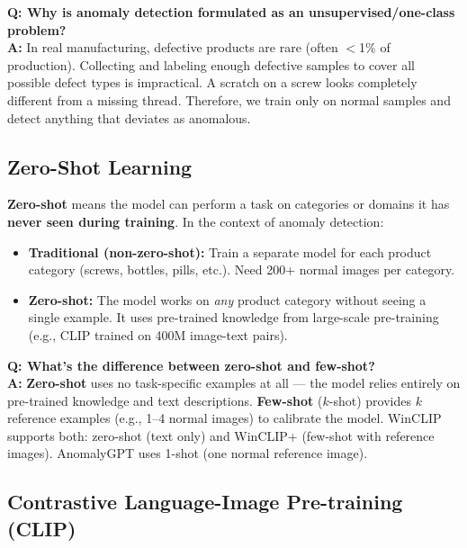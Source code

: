 \documentclass[12pt, a4paper]{article}
\begin{document}
\begin{vivaqa}
\textbf{Q: Why is anomaly detection formulated as an unsupervised/one-class problem?}\\[4pt]
\textbf{A:} In real manufacturing, defective products are rare (often $<$1\% of production). Collecting and labeling enough defective samples to cover all possible defect types is impractical. A scratch on a screw looks completely different from a missing thread. Therefore, we train only on normal samples and detect anything that deviates as anomalous.
\end{vivaqa}

\subsection{Zero-Shot Learning}

\textbf{Zero-shot} means the model can perform a task on categories or domains it has \textbf{never seen during training}. In the context of anomaly detection:

\begin{itemize}[leftmargin=*]
    \item \textbf{Traditional (non-zero-shot):} Train a separate model for each product category (screws, bottles, pills, etc.). Need 200+ normal images per category.
    \item \textbf{Zero-shot:} The model works on \textit{any} product category without seeing a single example. It uses pre-trained knowledge from large-scale pre-training (e.g., CLIP trained on 400M image-text pairs).
\end{itemize}

\begin{vivaqa}
\textbf{Q: What's the difference between zero-shot and few-shot?}\\[4pt]
\textbf{A:} \textbf{Zero-shot} uses no task-specific examples at all --- the model relies entirely on pre-trained knowledge and text descriptions. \textbf{Few-shot} ($k$-shot) provides $k$ reference examples (e.g., 1--4 normal images) to calibrate the model. WinCLIP supports both: zero-shot (text only) and WinCLIP+ (few-shot with reference images). AnomalyGPT uses 1-shot (one normal reference image).
\end{vivaqa}

\subsection{Contrastive Language-Image Pre-training (CLIP)}
\end{document}
